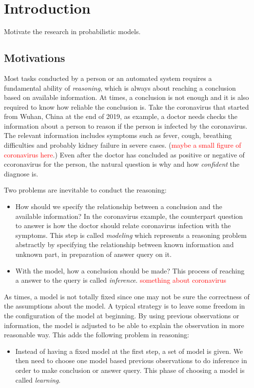 \chapter{Introduction}
\label{chapter1}

Motivate the research in probabilistic models.

\section{Motivations}
\label{section1.1}

Most tasks conducted by a person or an automated system requires a fundamental ability of \textit{reasoning}, which is always about reaching a conclusion based on available information. At times, a conclusion is not enough and it is also required to know how reliable the conclusion is. Take the coronavirus that started from Wuhan, China at the end of 2019, as example, a doctor needs checks the information about a person to reason if the person is infected by the coronavirus. The relevant information includes symptoms such as fever, cough, breathing difficulties and probably kidney failure in severe cases. (\textcolor{red}{maybe a small figure of coronavirus here}.) Even after the doctor has concluded as positive or negative of ccoronavirus for the person, the natural question is why and how \textit{confident} the diagnose is.

Two problems are inevitable to conduct the reasoning:
\begin{itemize}
\item How should we specify the relationship between a conclusion and the available information? In the coronavirus example, the counterpart question to answer is how the doctor should relate coronavirus infection with the symptoms. This step is called \textit{modeling} which represents a reasoning problem abstractly by specifying the relationship between known information and unknown part, in preparation of answer query on it.
\item With the model, how a conclusion should be made? This process of reaching a answer to the query is called \textit{inference}. \textcolor{red}{something about coronavirus}
\end{itemize}

As times, a model is not totally fixed since one may not be sure the correctness of the assumptions about the model. A typical strategy is to leave some freedom in the configuration of the model at beginning. By using previous observations or information, the model is adjusted to be able to explain the observation in more reasonable way. This adds the following problem in reasoning:
\begin{itemize}
\item Instead of having a fixed model at the first step, a set of model is given. We then need to choose one model based previous observations to do inference in order to make conclusion or answer query. This phase of choosing a model is called \textit{learning}.
\end{itemize}

